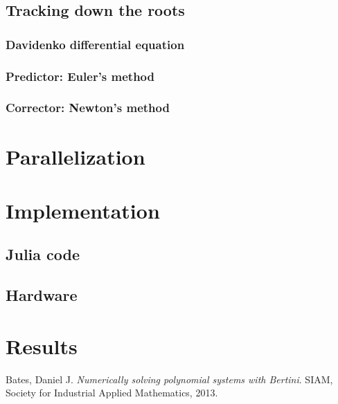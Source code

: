 \documentclass[a4paper]{article}
\theoremstyle{definition}
\theoremstyle{definition}
\theoremstyle{remark}
\theoremstyle{definition}
\begin{document}
\subsection{Tracking down the roots}
\subsubsection{Davidenko differential equation}
\subsubsection{Predictor: Euler's method}
\subsubsection{Corrector: Newton's method}

\section{Parallelization}

\section{Implementation}
\subsection{Julia code}
\subsection{Hardware}

\section{Results}

 Bates, Daniel J. \textit{Numerically solving polynomial systems with Bertini}. SIAM, Society for Industrial Applied Mathematics, 2013.
\end{document}
